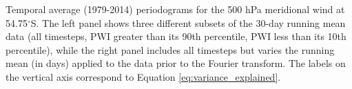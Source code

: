 \label{fig:periodograms}
Temporal average (1979-2014) periodograms for the 500 hPa meridional wind at 54.75$^{\circ}$S. The left panel shows three different subsets of the 30-day running mean data (all timesteps, PWI greater than its 90th percentile, PWI less than its 10th percentile), while the right panel includes all timesteps but varies the running mean (in days) applied to the data prior to the Fourier transform. The labels on the vertical axis correspond to Equation \ref{eq:variance_explained}. 